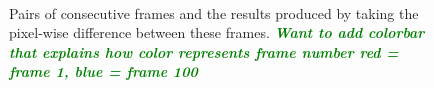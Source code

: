 \documentclass[smallcondensed, final]{svjour3}
\newcommand{\willie}[1]{\textcolor{green}{\textsf{\emph{\textbf{\textcolor{green}{#1}}}}}}
\begin{document}
\begin{figure}
  \\
  \caption{Pairs of consecutive frames and the results produced by taking the pixel-wise difference between these frames. \willie{Want to add colorbar that explains how color represents frame number red = frame 1, blue = frame 100}}
  \label{fig:img_and_framediff}
\end{figure}
\end{document}
